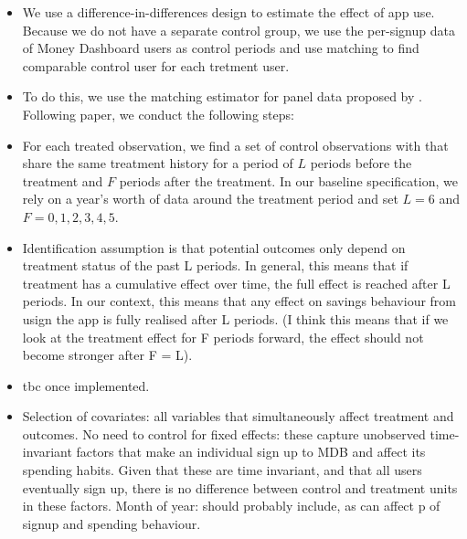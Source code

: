 \begin{itemize}
    \item We use a difference-in-differences design to estimate the effect of
        app use. Because we do not have a separate control group, we use the
        per-signup data of Money Dashboard users as control periods and use
        matching to find comparable control user for each tretment user.

    \item To do this, we use the matching estimator for panel data proposed by
        \citet{imai2021matching}. Following paper, we conduct the following
        steps:

    \item For each treated observation, we find a set of control observations
        with that share the same treatment history for a period of $L$ periods
        before the treatment and $F$ periods after the treatment. In our
        baseline specification, we rely on a year's worth of data around the
        treatment period and set $L=6$ and $F = 0, 1, 2, 3, 4, 5$.

    \item Identification assumption is that potential outcomes only depend on
        treatment status of the past L periods. In general, this means that if
        treatment has a cumulative effect over time, the full effect is reached
        after L periods. In our context, this means that any effect on savings
        behaviour from usign the app is fully realised after L periods. (I
        think this means that if we look at the treatment effect for F periods
        forward, the effect should not become stronger after F = L).

    \item tbc once implemented.

    \item Selection of covariates: all variables that simultaneously affect
        treatment and outcomes. No need to control for fixed effects: these
        capture unobserved time-invariant factors that make an individual sign
        up to MDB and affect its spending habits. Given that these are time
        invariant, and that all users eventually sign up, there is no
        difference between control and treatment units in these factors. Month
        of year: should probably include, as can affect p of signup and
        spending behaviour.

\end{itemize}

